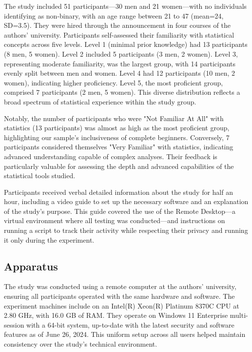 \documentclass{article}
\begin{document}
The study included 51 participants—30 men and 21 women—with no individuals identifying as non-binary, with an age range between 21 to 47 (mean=24, SD=3.5). They were hired through the announcement in four courses of the authors' university. Participants self-assessed their familiarity with statistical concepts across five levels. Level 1 (minimal prior knowledge) had 13 participants (8 men, 5 women). Level 2 included 5 participants (3 men, 2 women). Level 3, representing moderate familiarity, was the largest group, with 14 participants evenly split between men and women. Level 4 had 12 participants (10 men, 2 women), indicating higher proficiency. Level 5, the most proficient group, comprised 7 participants (2 men, 5 women). This diverse distribution reflects a broad spectrum of statistical experience within the study group.

Notably, the number of participants who were "Not Familiar At All" with statistics (13 participants) was almost as high as the most proficient group, highlighting our sample's inclusiveness of complete beginners.  Conversely, 7 participants considered themselves "Very Familiar" with statistics, indicating advanced understanding capable of complex analyses. Their feedback is particularly valuable for assessing the depth and advanced capabilities of the statistical tools studied.

Participants received verbal detailed information about the study for half an hour, including a video guide to set up the necessary software and an explanation of the study's purpose. This guide covered the use of the Remote Desktop—a virtual environment where all testing was conducted—and instructions on running a script to track their activity while respecting their privacy and running it only during the experiment. 

\subsection{Apparatus}

The study was conducted using a remote computer at the authors' university, ensuring all participants operated with the same hardware and software. The experiment machines include on an Intel(R) Xeon(R) Platinum 8370C CPU at 2.80 GHz, with 16.0 GB of RAM. They operate on Windows 11 Enterprise multi-session with a 64-bit system, up-to-date with the latest security and software features as of June 26, 2024. This uniform setup across all users helped maintain consistency over the study's technical environment.
\end{document}
